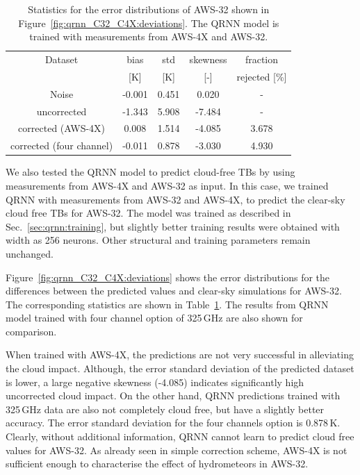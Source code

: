 \documentclass[12pt]{article}
\begin{document}
\begin{table}[!tb]
	\centering
	\begin{tabular}[b]{c|c|c|c|c}
		Dataset  		  &   bias &   std &   skewness & fraction  \\
		&   [K]  &   [K] & [-] & rejected [\%]\\
		\hline
		Noise                      & -0.001 & 0.451 &              0.020 &      - \\
		uncorrected                & -1.343 & 5.908 &             -7.484 &      - \\
		corrected (AWS-4X)         &  0.008 & 1.514 &             -4.085 &      3.678 \\
		corrected (four channel)   & -0.011 & 0.878 &             -3.030 &      4.930 \\
		\hline
	\end{tabular}
	\caption{Statistics for the error distributions of AWS-32 shown in Figure~\ref{fig:qrnn_C32_C4X:deviations}. The QRNN model is trained with measurements from AWS-4X and AWS-32.}
	\label{tab:qrnn:C32:C4X}
\end{table} 
We also tested the QRNN model to predict cloud-free TBs by using measurements
from AWS-4X and AWS-32 as input. In this case, we trained QRNN with
measurements from AWS-32 and AWS-4X, to predict the clear-sky cloud free TBs
for AWS-32. The model was trained as described in
Sec.~\ref{sec:qrnn:training}, but slightly better training results were
obtained with width as 256 neurons. Other structural and training parameters
remain unchanged.

Figure~\ref{fig:qrnn_C32_C4X:deviations} shows the error distributions for the
differences between the predicted values and clear-sky simulations for AWS-32.
The corresponding statistics are shown in Table~\ref{tab:qrnn:C32:C4X}. The
results from QRNN model trained with four channel option of 325\,GHz are also
shown for comparison.

When trained with AWS-4X, the predictions are not very successful in
alleviating the cloud impact. Although, the error standard deviation of the
predicted dataset is lower, a large negative skewness (-4.085) indicates
significantly high uncorrected cloud impact. On the other hand, QRNN
predictions trained with 325\,GHz data are also not completely cloud free, but
have a slightly better accuracy. The error standard deviation for the four
channels option is 0.878\,K.
Clearly, without additional information, QRNN cannot learn to predict cloud
free values for AWS-32. As already seen in simple correction scheme, AWS-4X is
not sufficient enough to characterise the effect of hydrometeors in AWS-32.
\end{document}
